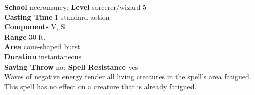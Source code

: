 \textbf{School} necromancy; \textbf{Level} sorcerer/wizard 5\\
\textbf{Casting Time} 1 standard action\\
\textbf{Components} V, S\\
\textbf{Range} 30 ft.\\
\textbf{Area} cone-shaped burst\\
\textbf{Duration} instantaneous\\
\textbf{Saving Throw} no; \textbf{Spell Resistance} yes\\
Waves of negative energy render all living creatures in the spell's area fatigued. This spell has no effect on a creature that is already fatigued.\\
